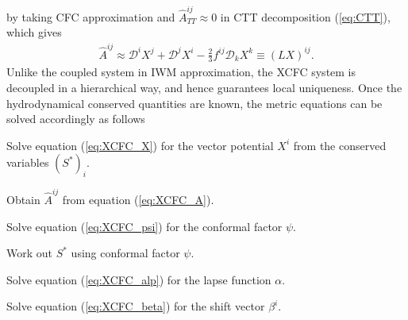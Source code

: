 by taking CFC approximation and $\hat{A}^{ij}_{TT} \approx 0$ in CTT decomposition (\cref{eq:CTT}),
which gives
\begin{align}\label{eq:XCFC_A}
    \hat{A}^{ij} \approx \mathcal{D}^i X^j + \mathcal{D}^j X^i - \frac{2}{3} f^{ij} \mathcal{D}_k X^k \equiv \left(LX \right)^{ij}.
\end{align}
Unlike the coupled system in IWM approximation, the XCFC system is decoupled in a hierarchical way,
and hence guarantees local uniqueness.
Once the hydrodynamical conserved quantities are known,
the metric equations can be solved accordingly as follows
\begin{Step}
    \item Solve equation (\ref{eq:XCFC_X}) for the vector potential $X^i$ from the conserved variables $\left(S^*\right)_i$.
    \item Obtain $\hat{A}^{ij}$ from equation (\ref{eq:XCFC_A}).
    \item Solve equation (\ref{eq:XCFC_psi}) for the conformal factor $\psi$.
    \item Work out $S^*$ using conformal factor $\psi$.
    \item Solve equation (\ref{eq:XCFC_alp}) for the lapse function $\alpha$.
    \item Solve equation (\ref{eq:XCFC_beta}) for the shift vector $\beta^i$.
\end{Step}

